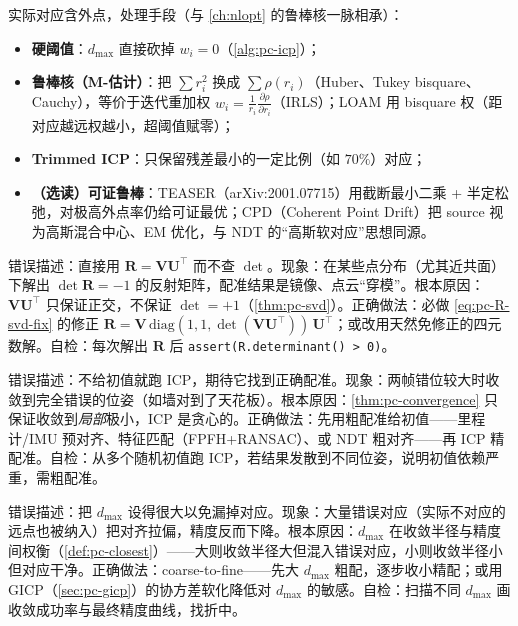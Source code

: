实际对应含外点，处理手段（与 \cref{ch:nlopt} 的鲁棒核一脉相承）：
\begin{itemize}
  \item \textbf{硬阈值}：$d_{\max}$ 直接砍掉 $w_i=0$（\cref{alg:pc-icp}）；
  \item \textbf{鲁棒核（M-估计）}：把 $\sum r_i^2$ 换成 $\sum\rho(r_i)$（Huber、Tukey bisquare、Cauchy），等价于迭代重加权 $w_i=\frac{1}{r_i}\frac{\partial\rho}{\partial r_i}$（IRLS）；LOAM 用 bisquare 权（距对应越远权越小，超阈值赋零）；
  \item \textbf{Trimmed ICP}：只保留残差最小的一定比例（如 $70\%$）对应；
  \item \textbf{（选读）可证鲁棒}：TEASER\cite{yang2021teaser}（arXiv:2001.07715）用截断最小二乘 + 半定松弛，对极高外点率仍给可证最优；CPD\cite{myronenko2010cpd}（Coherent Point Drift）把 source 视为高斯混合中心、EM 优化，与 NDT 的“高斯软对应”思想同源。
\end{itemize}

\begin{pitfall}
错误描述：直接用 $\mathbf{R}=\mathbf{V}\mathbf{U}^\top$ 而不查 $\det$。现象：在某些点分布（尤其近共面）下解出 $\det\mathbf{R}=-1$ 的反射矩阵，配准结果是镜像、点云“穿模”。根本原因：$\mathbf{V}\mathbf{U}^\top$ 只保证正交，不保证 $\det=+1$（\cref{thm:pc-svd}）。正确做法：必做 \cref{eq:pc-R-svd-fix} 的修正 $\mathbf{R}=\mathbf{V}\,\mathrm{diag}(1,1,\det(\mathbf{V}\mathbf{U}^\top))\,\mathbf{U}^\top$；或改用天然免修正的四元数解。自检：每次解出 $\mathbf{R}$ 后 \texttt{assert(R.determinant() > 0)}。
\end{pitfall}

\begin{pitfall}
错误描述：不给初值就跑 ICP，期待它找到正确配准。现象：两帧错位较大时收敛到完全错误的位姿（如墙对到了天花板）。根本原因：\cref{thm:pc-convergence} 只保证收敛到\emph{局部}极小，ICP 是贪心的。正确做法：先用粗配准给初值——里程计/IMU 预对齐、特征匹配（FPFH+RANSAC）、或 NDT 粗对齐——再 ICP 精配准。自检：从多个随机初值跑 ICP，若结果发散到不同位姿，说明初值依赖严重，需粗配准。
\end{pitfall}

\begin{pitfall}
错误描述：把 $d_{\max}$ 设得很大以免漏掉对应。现象：大量错误对应（实际不对应的远点也被纳入）把对齐拉偏，精度反而下降。根本原因：$d_{\max}$ 在收敛半径与精度间权衡（\cref{def:pc-closest}）——大则收敛半径大但混入错误对应，小则收敛半径小但对应干净。正确做法：coarse-to-fine——先大 $d_{\max}$ 粗配，逐步收小精配；或用 GICP（\cref{sec:pc-gicp}）的协方差软化降低对 $d_{\max}$ 的敏感。自检：扫描不同 $d_{\max}$ 画收敛成功率与最终精度曲线，找折中。
\end{pitfall}

